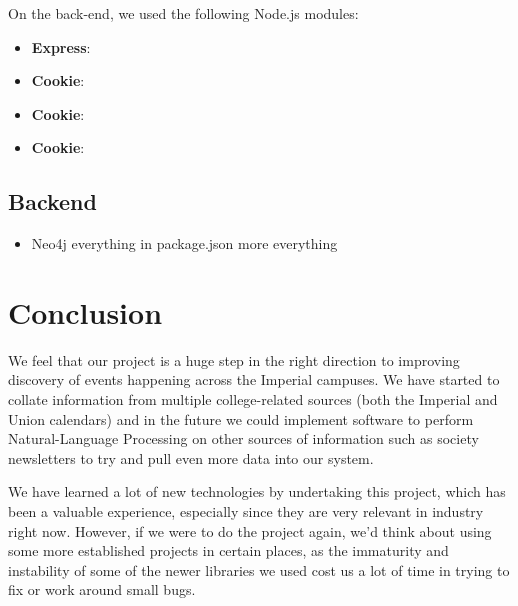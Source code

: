 \documentclass[11pt]{article}
\begin{document}
On the back-end, we used the following Node.js modules:
\begin{itemize}
    \item \textbf{Express}:
    \item \textbf{Cookie}:
    \item \textbf{Cookie}:
    \item \textbf{Cookie}:
\end{itemize}

\subsection{Backend}
\begin{itemize}
\item Neo4j
	\subitem everything in package.json
	\subitem more everything
\end{itemize}
\section {Conclusion}
We feel that our project is a huge step in the right direction to improving discovery of events happening across the Imperial campuses. We have started to collate information from multiple college-related sources (both the Imperial and Union calendars) and in the future we could implement software to perform Natural-Language Processing on other sources of information such as society newsletters to try and pull even more data into our system.

We have learned a lot of new technologies by undertaking this project, which has been a valuable experience, especially since they are very relevant in industry right now. However, if we were to do the project again, we'd think about using some more established projects in certain places, as the immaturity and instability of some of the newer libraries we used cost us a lot of time in trying to fix or work around small bugs.


\newpage

\theendnotes
\end{document}
